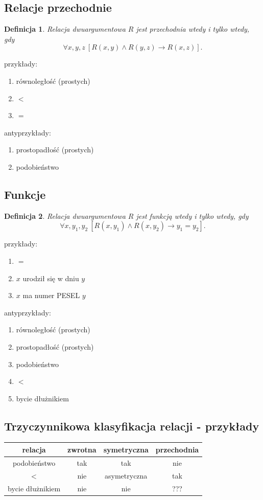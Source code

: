 \documentclass[12pt]{article}
\newtheorem{definicja}{Definicja}
\begin{document}
\subsection{Relacje przechodnie}
%
\begin{definicja}
Relacja dwuargumentowa $R$ jest \emph{przechodnia} wtedy i tylko wtedy, gdy $$\forall x,y,z ~[R(x,y) \land R(y, z) \to R(x,z)].$$
\end{definicja}
%
przykłady:
\begin{enumerate}
\item równoległość (prostych)
\item $<$
\item $=$
\end{enumerate}
%
antyprzykłady:
\begin{enumerate}
\item prostopadłość (prostych)
\item podobieństwo
\end{enumerate}
%

\subsection{Funkcje}
%
\begin{definicja}
Relacja dwuargumentowa $R$ jest \emph{funkcją} wtedy i tylko wtedy, gdy $$\forall x,y_{1},y_{2} ~[R(x,y_{1}) \land R(x, y_{2}) \to y_{1}=y_{2}].$$
\end{definicja}
%
przykłady:
\begin{enumerate}
\item $=$
\item $x$ urodził się w dniu $y$
\item $x$ ma numer PESEL $y$
\end{enumerate}
%
antyprzykłady:
\begin{enumerate}
\item równoległość (prostych)
\item prostopadłość (prostych)
\item podobieństwo
\item $<$
\item bycie dłużnikiem
\end{enumerate}
%

\subsection{Trzyczynnikowa klasyfikacja relacji  - przykłady}
%
\begin{center}
\begin{table}
\begin{tabular}{|c||c|c|c|}
\hline 
\textbf{relacja} & \textbf{zwrotna} & \textbf{symetryczna}  & \textbf{przechodnia} \\
\hline
podobieństwo & tak & tak & nie \\ 
\hline
$<$ & nie & asymetryczna & tak\\
\hline
bycie dłużnikiem & nie & nie & ??? \\
\hline
\end{tabular}
\end{table}
\end{center}
% 
\end{document}
